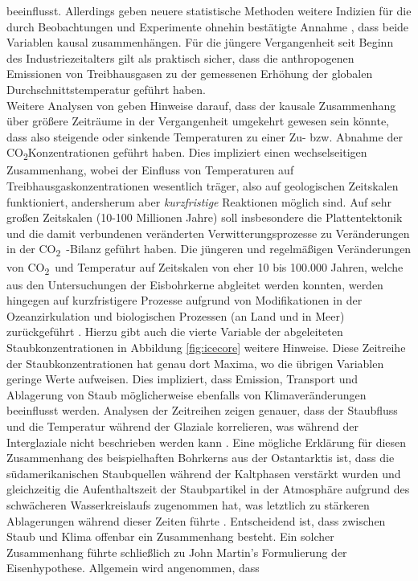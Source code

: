 \documentclass[12pt,a4paper,onecolumn]{scrartcl}
\newcommand{\cotwo}{CO\textsubscript{2}}
\begin{document}
beeinflusst. Allerdings geben neuere statistische Methoden \citep{Stips.2016} weitere Indizien für die durch Beobachtungen und Experimente ohnehin bestätigte Annahme , dass beide Variablen kausal zusammenhängen. Für die jüngere Vergangenheit seit Beginn des Industriezeitalters gilt als praktisch sicher, dass die anthropogenen Emissionen von Treibhausgasen zu der gemessenen Erhöhung der globalen Durchschnittstemperatur geführt haben.  \\

Weitere Analysen von \citet{Stips.2016} geben Hinweise darauf, dass der kausale Zusammenhang über größere Zeiträume in der Vergangenheit umgekehrt gewesen sein könnte, dass also steigende oder sinkende Temperaturen zu einer Zu- bzw. Abnahme der \cotwo Konzentrationen geführt haben. Dies impliziert einen wechselseitigen Zusammenhang, wobei der Einfluss von Temperaturen auf Treibhausgaskonzentrationen wesentlich träger, also auf geologischen Zeitskalen funktioniert, andersherum aber \textit{kurzfristige} Reaktionen möglich sind.  Auf sehr großen Zeitskalen (10-100 Millionen Jahre) soll insbesondere die Plattentektonik und die damit verbundenen veränderten Verwitterungsprozesse zu Veränderungen in der \cotwo \ -Bilanz geführt haben. Die jüngeren und regelmäßigen Veränderungen von \cotwo \ und Temperatur auf Zeitskalen von eher 10 bis 100.000 Jahren, welche aus den Untersuchungen der Eisbohrkerne abgleitet werden konnten, werden hingegen auf kurzfristigere Prozesse aufgrund von Modifikationen in der Ozeanzirkulation und biologischen Prozessen (an Land und in Meer) zurückgeführt \citep{Emerson.2009}. Hierzu gibt auch die vierte Variable der abgeleiteten Staubkonzentrationen in Abbildung \ref{fig:icecore} weitere Hinweise. Diese Zeitreihe der Staubkonzentrationen hat genau dort Maxima, wo die übrigen Variablen geringe Werte aufweisen. Dies impliziert, dass Emission, Transport und Ablagerung von Staub möglicherweise ebenfalls von Klimaveränderungen beeinflusst werden. Analysen der Zeitreihen zeigen genauer, dass der Staubfluss und die Temperatur während der Glaziale korrelieren, was während der Interglaziale nicht beschrieben werden kann \citep{Lambert.2008}. Eine mögliche Erklärung für diesen Zusammenhang des beispielhaften Bohrkerns aus der Ostantarktis ist, dass die südamerikanischen Staubquellen während der Kaltphasen verstärkt wurden und gleichzeitig die Aufenthaltszeit der Staubpartikel in der Atmosphäre aufgrund des schwächeren Wasserkreislaufs zugenommen hat, was letztlich zu stärkeren Ablagerungen während dieser Zeiten führte \citep{Lambert.2008}. Entscheidend ist, dass zwischen Staub und Klima offenbar ein Zusammenhang besteht. Ein solcher Zusammenhang führte schließlich zu John Martin's Formulierung der Eisenhypothese. Allgemein wird angenommen, dass
\end{document}
